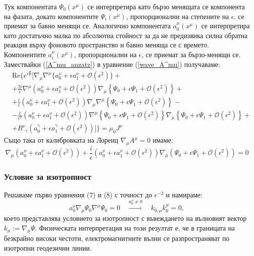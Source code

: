 Тук компонентата $\Psi_0(x^\mu)$ се интерпретира като бързо менящата се компонента на фазата, докато компонентите $\Psi_i(x^\mu)$, пропорционални на степените на $\epsilon$, се приемат за бавно менящи се. Аналогично компонентата $a_0^\mu(x^\mu)$ се интерпретира като достатъчно малка по абсолютна стойност за да не предизвика силна обратна реакция върху фоновото пространство и бавно меняща се с времето. Компонентите $a_i^\mu(x^\mu)$, пропорционални на $\epsilon$, се приемат за бързо-менящи се.\\
Замествайки (\ref{A^mu_anzatz}) в уравнение (\ref{wave_A^mu}) получаваме:
\begin{equation}
	\begin{split}
	&\text{Re}\bigg\{ e^{i\frac{\Psi}{\epsilon}}  \bigg[  \nabla_{\mu}\nabla^\mu\{a_0^\nu + \epsilon a_1^\nu + \mathcal{O}(\epsilon^2) \} + \\
	& + \frac{2i}{\epsilon} \nabla^{\mu}\left( a_0^\nu + \epsilon a_1^\nu + \mathcal{O}(\epsilon^2) \right) \nabla_\mu \left\{\Psi_0 + \epsilon \Psi_1 + \mathcal{O}(\epsilon^2) \right\} + \\
	 & + \frac{i}{\epsilon} \left(a_0^\nu + \epsilon a_1^\nu + \mathcal{O}(\epsilon^2) \right) \nabla_\mu\nabla^\mu\left\{\Psi_0 + \epsilon \Psi_1 + \mathcal{O}(\epsilon^2) \right\} - \\
	 & - \frac{1}{\epsilon^2} \left(a_0^\nu + \epsilon a_1^\nu + \mathcal{O}(\epsilon^2) \right) \nabla^\mu\left\{ \Psi_0 + \epsilon \Psi_1 + \mathcal{O}(\epsilon^2) \right\}\nabla_\mu\left\{\Psi_0 + \epsilon \Psi_1 + \mathcal{O}(\epsilon^2)\right\} + \\
	 & + R^\nu_{\,\,\,\gamma} \left( a_0^\gamma + \epsilon a_1^\gamma + \mathcal{O}(\epsilon^2) \right) \bigg] \bigg\}  = \mu_0 J^\nu
	\end{split}
\end{equation}
Също така от калибровката на Лоренц $\nabla_\mu A^\mu = 0$ имаме:
\begin{equation}
	\nabla_\mu\left(a_0^\nu + \epsilon a_1^\nu + \mathcal{O}(\epsilon^2)\right) + \frac{i}{\epsilon}\left(a_0^\nu + \epsilon a_1^\nu + \mathcal{O}(\epsilon^2)\right)\nabla_\mu\left(\Psi_0 + \epsilon \Psi_1 + \mathcal{O}(\epsilon^2) \right) = 0
\end{equation}

\subsubsection{Условие за изотропност}

Решаваме първо уравнения (7) и (8) с точност до $\epsilon^{-2}$ и намираме:
\begin{equation}
	a^\nu_0\nabla_\mu\Psi_0\nabla^\mu\Psi_0 = 0\quad \xrightarrow{a^\nu_0\ne 0}\quad k_{0,\mu} k^\mu_0 = 0,
\end{equation}
 което представлява условието за изотропност с въвеждането на вълновият вектор $k_\mu := \nabla_\mu\Psi$. Физическата интерпретация на този резултат е, че в границата на безкрайно високи честоти, електромагнитните вълни се разпространяват по изотропни геодезични линии.

